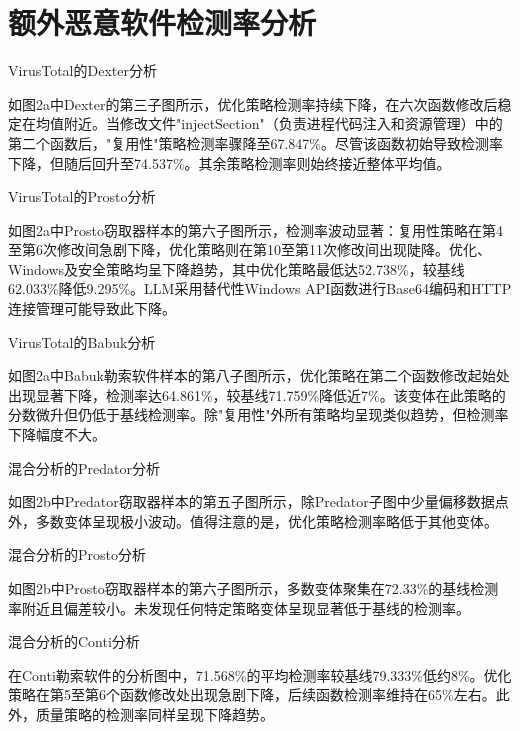 \chapter{额外恶意软件检测率分析}
VirusTotal的Dexter分析

如图2a中Dexter的第三子图所示，优化策略检测率持续下降，在六次函数修改后稳定在均值附近。当修改文件"injectSection"（负责进程代码注入和资源管理）中的第二个函数后，"复用性"策略检测率骤降至67.847\%。尽管该函数初始导致检测率下降，但随后回升至74.537\%。其余策略检测率则始终接近整体平均值。

VirusTotal的Prosto分析

如图2a中Prosto窃取器样本的第六子图所示，检测率波动显著：复用性策略在第4至第6次修改间急剧下降，优化策略则在第10至第11次修改间出现陡降。优化、Windows及安全策略均呈下降趋势，其中优化策略最低达52.738\%，较基线62.033\%降低9.295\%。LLM采用替代性Windows API函数进行Base64编码和HTTP连接管理可能导致此下降。

VirusTotal的Babuk分析

如图2a中Babuk勒索软件样本的第八子图所示，优化策略在第二个函数修改起始处出现显著下降，检测率达64.861\%，较基线71.759\%降低近7\%。该变体在此策略的分数微升但仍低于基线检测率。除"复用性"外所有策略均呈现类似趋势，但检测率下降幅度不大。

混合分析的Predator分析

如图2b中Predator窃取器样本的第五子图所示，除Predator子图中少量偏移数据点外，多数变体呈现极小波动。值得注意的是，优化策略检测率略低于其他变体。

混合分析的Prosto分析

如图2b中Prosto窃取器样本的第六子图所示，多数变体聚集在72.33\%的基线检测率附近且偏差较小。未发现任何特定策略变体呈现显著低于基线的检测率。

混合分析的Conti分析

在Conti勒索软件的分析图中，71.568\%的平均检测率较基线79.333\%低约8\%。优化策略在第5至第6个函数修改处出现急剧下降，后续函数检测率维持在65\%左右。此外，质量策略的检测率同样呈现下降趋势。
